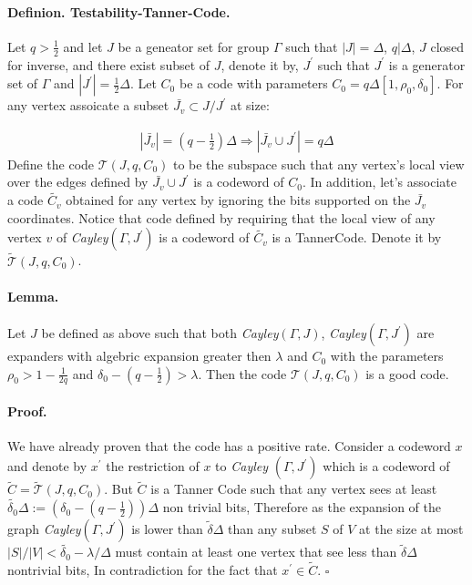 \documentclass{article}
\newcommand{\Jvv}{ \bar{J_{v}} }
\newcommand{\Cvv}{ \tilde{C_{v}} }
\begin{document}
\begin{multicols*}{2}
  \paragraph{Definion. Testability-Tanner-Code.} Let $q > \frac{1}{2}$ and let $J$ be a geneator set for group $\Gamma$ such that $|J| = \Delta$, $q | \Delta $, $J$ closed for inverse, and there exist subset of $J$, denote it by, $J^{\prime}$ such that $J^{\prime}$ is a generator set of $\Gamma$ and $|J^{\prime}| = \frac{1}{2}\Delta$. Let $C_{0}$ be a code with parameters $C_{0} = q\Delta \left[1, \rho_{0}, \delta_{0}\right]$. For any vertex assoicate a subset $\Jvv \subset J/J^{\prime}$ at size: 

  \begin{equation*}
    \begin{split}
      |\Jvv| = \left( q - \frac{1}{2} \right)\Delta \Rightarrow |\Jvv \cup J^{\prime}| = q\Delta
    \end{split}
  \end{equation*}
  Define the code $\mathcal{T}\left(J, q , C_{0}\right)$ to be the subspace such that any vertex's local view over the edges defined by $\Jvv \cup J^{\prime}$ is a codeword of $C_{0}$. In addition, let's associate a code $\Cvv$ obtained for any vertex by ignoring the bits supported on the $\Jvv$ coordinates. Notice that code defined by requiring that the local view of any vertex $v$ of \emph{Cayley}$\left(\Gamma, J^{\prime} \right)$ is a codeword of $\Cvv$ is a TannerCode. Denote it by $ \tilde{\mathcal{T}}\left(J, q ,C_{0}\right)$.   

  \paragraph{Lemma.} Let $J$ be defined as above such that both \emph{Cayley}$\left( \Gamma, J \right)$, \emph{Cayley}$\left( \Gamma, J^{\prime} \right)$ are expanders with algebric expansion greater then $\lambda$ and $C_0$ with the parameters $\rho_{0} > 1 - \frac{1}{2q}$ and $ \delta_{0} - \left( q - \frac{1}{2} \right) > \lambda$. Then the code $\mathcal{T}\left(J, q ,C_{0}\right)$ is a good code. 
  \paragraph{Proof.} We have already proven that the code has a positive rate. Consider a codeword $x$ and denote by $x^{\prime}$ the restriction of $x$ to \emph{Cayley }$\left( \Gamma, J^{\prime}  \right)$ which is a codeword of $\tilde{C} = \tilde{\mathcal{T}}\left(J, q ,C_{0}\right)$. But $\tilde{C}$ is a Tanner Code such that any vertex sees at least $ \tilde{\delta_{0}} \Delta := \left(\delta_{0} - \left( q - \frac{1}{2}   \right) \right)\Delta $ non trivial bits, Therefore as the expansion of the graph \emph{Cayley}$\left( \Gamma, J^{\prime} \right)$ is lower than $\tilde{\delta}\Delta$ than any subset $S$ of $V$ at the size at most $|S|/|V| < \tilde{\delta_{0}} - \lambda / \Delta $  must contain at least one vertex that see less than  $\tilde{\delta}\Delta$ nontrivial bits, In contradiction for the fact that $x^{\prime} \in \tilde{C}$. $\square$ 


\end{multicols*}
\end{document}
